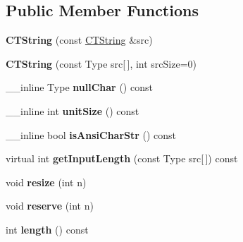\subsection*{Public Member Functions}
\begin{DoxyCompactItemize}
\item 
\hypertarget{classps_1_1CTString_a06a15cff26f88842c41c202abd617064}{}{\bfseries C\+T\+String} (const \hyperlink{classps_1_1CTString}{C\+T\+String} \&src)\label{classps_1_1CTString_a06a15cff26f88842c41c202abd617064}

\item 
\hypertarget{classps_1_1CTString_af716afe846a096ab7c8a0dbf3c743c33}{}{\bfseries C\+T\+String} (const Type src\mbox{[}$\,$\mbox{]}, int src\+Size=0)\label{classps_1_1CTString_af716afe846a096ab7c8a0dbf3c743c33}

\item 
\hypertarget{classps_1_1CTString_ad79e40154ce0698cb9aa6d57d647d489}{}\+\_\+\+\_\+inline Type {\bfseries null\+Char} () const \label{classps_1_1CTString_ad79e40154ce0698cb9aa6d57d647d489}

\item 
\hypertarget{classps_1_1CTString_a16d3963f75f801643ff2d7da8dd9ae55}{}\+\_\+\+\_\+inline int {\bfseries unit\+Size} () const \label{classps_1_1CTString_a16d3963f75f801643ff2d7da8dd9ae55}

\item 
\hypertarget{classps_1_1CTString_a561bf4365269870d1b8916362fea955d}{}\+\_\+\+\_\+inline bool {\bfseries is\+Ansi\+Char\+Str} () const \label{classps_1_1CTString_a561bf4365269870d1b8916362fea955d}

\item 
\hypertarget{classps_1_1CTString_af6c8d742cf745dbb7af7f9f217a6cc14}{}virtual int {\bfseries get\+Input\+Length} (const Type src\mbox{[}$\,$\mbox{]}) const \label{classps_1_1CTString_af6c8d742cf745dbb7af7f9f217a6cc14}

\item 
\hypertarget{classps_1_1CTString_a1b1e3f2181e1da0f62783e80885b65a2}{}void {\bfseries resize} (int n)\label{classps_1_1CTString_a1b1e3f2181e1da0f62783e80885b65a2}

\item 
\hypertarget{classps_1_1CTString_a9241043b3ad799cda968d90f6301f57f}{}void {\bfseries reserve} (int n)\label{classps_1_1CTString_a9241043b3ad799cda968d90f6301f57f}

\item 
\hypertarget{classps_1_1CTString_aa0b9f330ed03ac5f7c2ecdf06428f669}{}int {\bfseries length} () const \label{classps_1_1CTString_aa0b9f330ed03ac5f7c2ecdf06428f669}


\end{DoxyCompactItemize}
